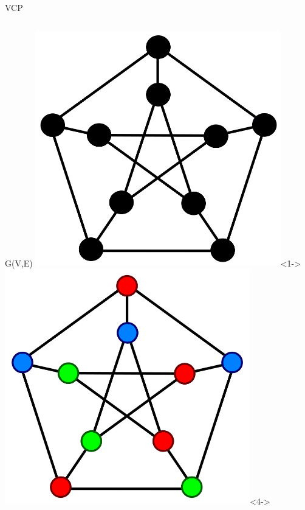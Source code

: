 \begin{frame}{VCP}
\begin{columns}
    
    \null
    \centering
      G(V,E)
      \null
      \includegraphics[width=0.8\textwidth]{figures/graph_coloring1.png}<1->
      \null
      \null
      \null
      \includegraphics[width=0.8\textwidth]{figures/graph_coloring.png}<4->
  \end{columns}
\end{frame}

